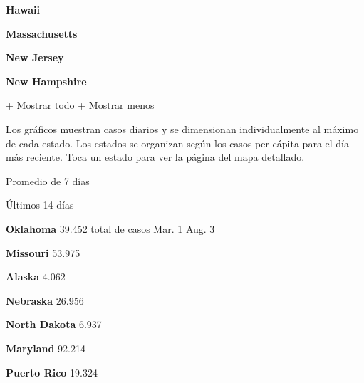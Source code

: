 \textbf{Hawaii}

\href{https://www.nytimes3xbfgragh.onion/interactive/2020/us/massachusetts-coronavirus-cases.html}{}

\textbf{Massachusetts}

\href{https://www.nytimes3xbfgragh.onion/interactive/2020/us/new-jersey-coronavirus-cases.html}{}

\textbf{New Jersey}

\href{https://www.nytimes3xbfgragh.onion/interactive/2020/us/new-hampshire-coronavirus-cases.html}{}

\textbf{New Hampshire}

+ Mostrar todo + Mostrar menos

Los gráficos muestran casos diarios y se dimensionan individualmente al
máximo de cada estado. Los estados se organizan según los casos per
cápita para el día más reciente. Toca un estado para ver la página del
mapa detallado.

\href{https://www.nytimes3xbfgragh.onion/interactive/2020/us/oklahoma-coronavirus-cases.html}{}

Promedio de 7 días

Últimos 14 días

\textbf{Oklahoma} 39.452 total de casos Mar. 1 Aug. 3

\href{https://www.nytimes3xbfgragh.onion/interactive/2020/us/missouri-coronavirus-cases.html}{}

\textbf{Missouri} 53.975

\href{https://www.nytimes3xbfgragh.onion/interactive/2020/us/alaska-coronavirus-cases.html}{}

\textbf{Alaska} 4.062

\href{https://www.nytimes3xbfgragh.onion/interactive/2020/us/nebraska-coronavirus-cases.html}{}

\textbf{Nebraska} 26.956

\href{https://www.nytimes3xbfgragh.onion/interactive/2020/us/north-dakota-coronavirus-cases.html}{}

\textbf{North Dakota} 6.937

\href{https://www.nytimes3xbfgragh.onion/interactive/2020/us/maryland-coronavirus-cases.html}{}

\textbf{Maryland} 92.214

\href{https://www.nytimes3xbfgragh.onion/interactive/2020/us/puerto-rico-coronavirus-cases.html}{}

\textbf{Puerto Rico} 19.324

\href{https://www.nytimes3xbfgragh.onion/interactive/2020/us/illinois-coronavirus-cases.html}{}

